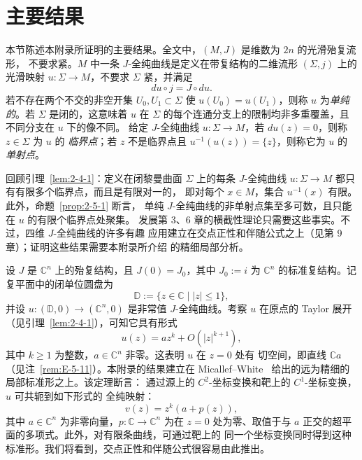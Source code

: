 \section{主要结果}\label{sec:E-1}

本节陈述本附录所证明的主要结果。全文中，$(M,J)$ 是维数为 $2n$ 的光滑殆复流形，
不要求紧。$M$ 中一条 $J$-全纯曲线是定义在带复结构的二维流形 $(\Sigma,j)$ 上的光滑映射
$u:\Sigma\to M$，不要求 $\Sigma$ 紧，并满足
\[
  du\circ j=J\circ du.
\]
若不存在两个不交的非空开集 $U_0,U_1\subset\Sigma$ 使
$u(U_0)=u(U_1)$，则称 $u$ 为\emph{单纯的}。若 $\Sigma$ 是闭的，这意味着 $u$
在 $\Sigma$ 的每个连通分支上的限制均非多重覆盖，且不同分支在 $u$ 下的像不同。
给定 $J$-全纯曲线 $u:\Sigma\to M$，若 $du(z)=0$，则称 $z\in\Sigma$ 为 $u$ 的
\emph{临界点}；若 $z$ 不是临界点且 $u^{-1}(u(z))=\{z\}$，则称它为 $u$ 的
\emph{单射点}。

回顾引理~\ref{lem:2-4-1}：定义在闭黎曼曲面 $\Sigma$ 上的每条
$J$-全纯曲线 $u:\Sigma\to M$ 都只有有限多个临界点，而且是有限对一的，
即对每个 $x\in M$，集合 $u^{-1}(x)$ 有限。此外，命题~\ref{prop:2-5-1} 断言，
单纯 $J$-全纯曲线的非单射点集至多可数，且只能在 $u$ 的有限个临界点处聚集。
发展第 3、6 章的横截性理论只需要这些事实。不过，四维 $J$-全纯曲线的许多有趣
应用建立在交点正性和伴随公式之上（见第 9 章）；证明这些结果需要本附录所介绍
的精细局部分析。

设 $J$ 是 $\mathbb C^n$ 上的殆复结构，且 $J(0)=J_0$，其中 $J_0:=i$ 为
$\mathbb C^n$ 的标准复结构。记复平面中的闭单位圆盘为
\[
  \mathbb D:=\{z\in\mathbb C\mid |z|\le1\},
\]
并设 $u:(\mathbb D,0)\to(\mathbb C^n,0)$ 是非常值 $J$-全纯曲线。考察 $u$
在原点的 Taylor 展开（见引理~\ref{lem:2-4-1}），可知它具有形式
\begin{equation}\label{eq:E-1-1}
  u(z)=az^k+O(|z|^{k+1}),
\end{equation}
其中 $k\ge1$ 为整数，$a\in\mathbb C^n$ 非零。这表明 $u$ 在 $z=0$ 处有
切空间，即直线 $\mathbb Ca$（见注~\ref{rem:E-5-11}）。本附录的结果建立在
Micallef--White~ 给出的远为精细的局部标准形之上。该定理断言：
通过源上的 $C^2$-坐标变换和靶上的 $C^1$-坐标变换，$u$ 可共轭到如下形式的
全纯映射：
\[
  v(z)=z^k(a+p(z)),
\]
其中 $a\in\mathbb C^n$ 为非零向量，$p:\mathbb C\to\mathbb C^n$ 为在 $z=0$
处为零、取值于与 $a$ 正交的超平面的多项式。此外，对有限条曲线，可通过靶上的
同一个坐标变换同时得到这种标准形。我们将看到，交点正性和伴随公式很容易由此推出。

